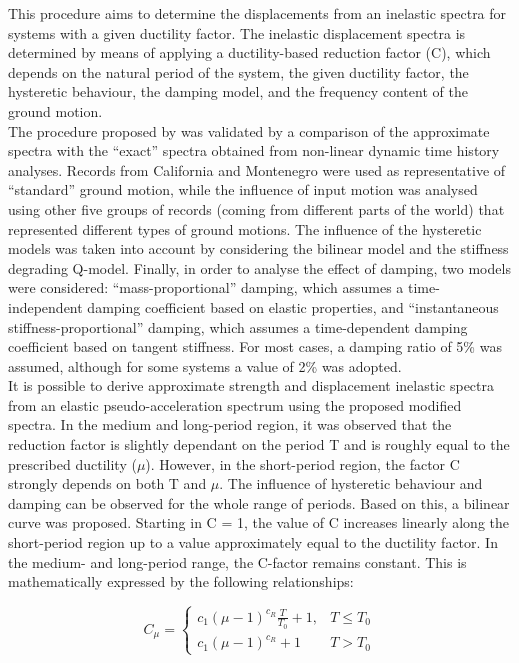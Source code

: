 This procedure aims to determine the displacements from an inelastic spectra for systems with a given ductility factor. The inelastic displacement spectra is determined by means of applying a ductility-based reduction factor (C), which depends on the natural period of the system, the given ductility factor, the hysteretic behaviour, the damping model, and the frequency content of the ground motion.\\

The procedure proposed by \citep{VidicEtAl1994} was validated by a comparison of the approximate spectra with the “exact” spectra obtained from non-linear dynamic time history analyses. Records from California and Montenegro were used as representative of “standard” ground motion, while the influence of input motion was analysed using other five groups of records (coming from different parts of the world) that represented different types of ground motions. The influence of the hysteretic models was taken into account by considering the bilinear model and the stiffness degrading Q-model. Finally, in order to analyse the effect of damping, two models were considered: “mass-proportional” damping, which assumes a time-independent damping coefficient based on elastic properties, and “instantaneous stiffness-proportional” damping, which assumes a time-dependent damping coefficient based on tangent stiffness. For most cases, a damping ratio of 5\% was assumed, although for some systems a value of 2\% was adopted.\\

It is possible to derive approximate strength and displacement inelastic spectra from an elastic pseudo-acceleration spectrum using the proposed modified spectra. In the medium and long-period region, it was observed that the reduction factor is slightly dependant on the period T and is roughly equal to the prescribed ductility ($\mu$). However, in the short-period region, the factor C strongly depends on both T and $\mu$. The influence of hysteretic behaviour and damping can be observed for the whole range of periods. Based on this, a bilinear curve was proposed. Starting in C = 1, the value of C increases linearly along the short-period region up to a value approximately equal to the ductility factor. In the medium- and long-period range, the C-factor remains constant. This is mathematically expressed by the following relationships:


\begin{equation}
C_\mu = \left\{
\begin{matrix}
  c_{1}\left(\mu-1\right)^{c_{R}}\frac{T}{T_{0}} + 1, & T\leq T_{0}  \\
  c_{1}\left(\mu-1\right)^{c_{R}} + 1 & T>T_{0}
 \end{matrix}
 \right.
\end{equation} 


